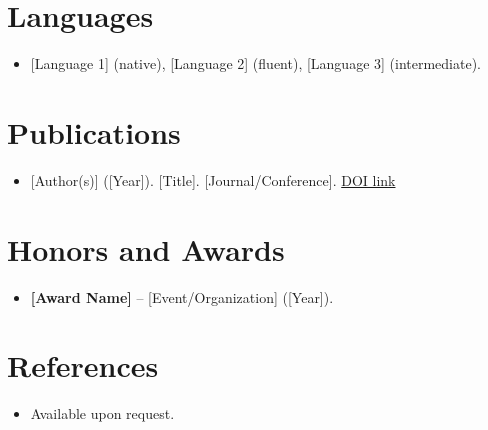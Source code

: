 \documentclass[11pt,a4paper,sans]{moderncv}
\begin{document}

\vspace{3pt}



\section{Languages}
\vspace{1pt}
\begin{itemize}
\item {[Language 1] (native), [Language 2] (fluent), [Language 3] (intermediate).}
\end{itemize}


\section{Publications}
\vspace{1pt}
\begin{itemize}
\item {[Author(s)] ([Year]). [Title]. [Journal/Conference]. \href{[DOI_URL]}{DOI link}}
\end{itemize}


\section{Honors and Awards}
\vspace{1pt}
\begin{itemize}
\item{\textbf{[Award Name]} -- [Event/Organization] ([Year]).}
\end{itemize}


\section{References}
\vspace{1pt}
\begin{itemize}
\item{Available upon request.}
\end{itemize}
\end{document}
